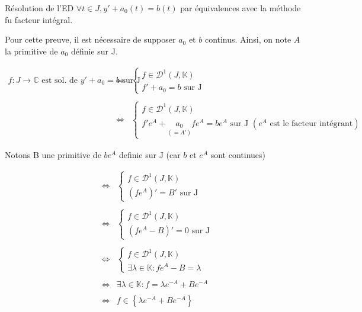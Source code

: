 \documentclass{article}
\date{10 novembre 2023}
\begin{document}
\maketitle

\begin{question_kholle}{Résolution de l'ED  $\forall t \in J, y' + a_{0}(t) = b(t)$ par équivalences avec la méthode fu facteur intégral.}
	
	Pour cette preuve, il est nécessaire de supposer $a_{0}$ et $b$ continus.
	Ainsi, on note $A$ la primitive de $a_{0}$ définie sur J. 
  
  	$$\begin{array}{ccl}
  	f : J \to \mathbb{C} \text{ est sol. de } y' + a_{0} = b \text{ sur J} 
  	& \iff & \left\{ \begin{array}{l}
  		f \in \mathcal{D}^1 (J, \mathbb{K}) \\
  		f' + a_{0} = b \text{ sur J }
  	\end{array}  \right.                                                                                \\\\
  	& \iff & \left\{ \begin{array}{l}
  		f \in \mathcal{D}^1 (J, \mathbb{K}) \\
  		f'  e^A + \underset{(= A')}{a_{0}} f  e^A = b  e^A \text{ sur J } (e^A \text{ est le facteur intégrant})
  	\end{array}\right.        
  \end{array} $$
  
  Notons B une primitive de $be^A$ definie sur J (car $b$ et $e^A$ sont continues)
  
  $$\begin{array}{ccl}  	
   & \iff &  \left\{ \begin{array}{l}
  			f \in \mathcal{D}^1 (J, \mathbb{K}) \\
  			(fe^A)' = B' \text{ sur J}
  	\end{array} \right. \\\\
  	 & \iff &  \left\{ \begin{array}{l}
  		f \in \mathcal{D}^1 (J, \mathbb{K}) \\
  		(fe^A - B)' = 0 \text{ sur J}
  	\end{array} \right. \\\\
   & \iff &  \left\{ \begin{array}{l}
  	f \in \mathcal{D}^1 (J, \mathbb{K}) \\
  	\exists \lambda \in \mathbb{K} : fe^A - B = \lambda
  \end{array} \right. \\\\
  & \iff & \exists \lambda \in \mathbb{K} : f = \lambda e^{-A} + B e^{-A} \\\\
  & \iff & f \in \left\lbrace \lambda e^{-A} + B e^{-A} \right\rbrace 
  \end{array} $$
  

\end{question_kholle}
\end{document}
